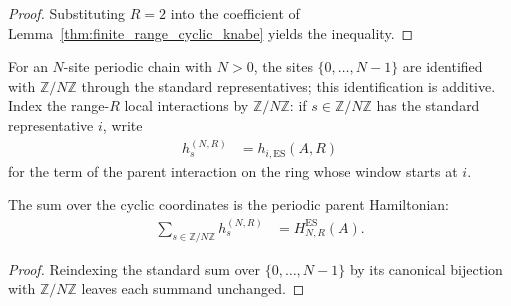 \begin{proof}
    \leanok
    Substituting $R=2$ into the coefficient of
    Lemma~\ref{thm:finite_range_cyclic_knabe} yields the inequality.
\end{proof}


\begin{definition}
    \label{def:cyclic_parent_local_coordinates}
    \leanok
    For an $N$-site periodic chain with $N>0$, the sites $\{0,\ldots,N-1\}$
    are identified with $\mathbb Z/N\mathbb Z$ through the standard
    representatives; this identification is additive. Index the range-$R$
    local interactions by $\mathbb Z/N\mathbb Z$: if
    $s\in\mathbb Z/N\mathbb Z$ has the standard representative $i$, write
    \begin{align}
        h_s^{(N,R)} & =h_{i,\mathrm{ES}}(A,R)
    \end{align}
    for the term of the parent interaction on the ring whose window starts at $i$.
\end{definition}

\begin{lemma}
    \label{thm:cyclic_parent_local_sum}
    \leanok
    The sum over the cyclic coordinates is the periodic parent Hamiltonian:
    \begin{align}
        \sum_{s\in\mathbb Z/N\mathbb Z}h_s^{(N,R)}
         & =H_{N,R}^{\mathrm{ES}}(A).
        \label{eq:cyclic_parent_local_sum}
    \end{align}
\end{lemma}

\begin{proof}
    \leanok
    Reindexing the standard sum over $\{0,\ldots,N-1\}$ by its canonical
    bijection with $\mathbb Z/N\mathbb Z$ leaves each summand unchanged.
\end{proof}

